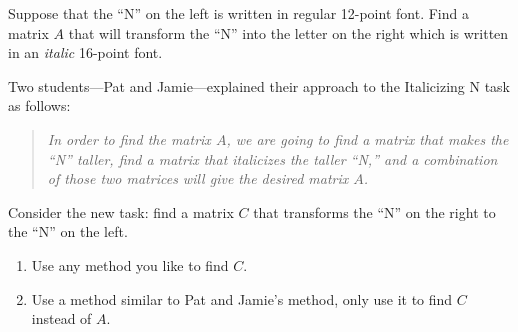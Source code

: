 \documentclass{problemset}
\begin{document}
\begin{minipage}{.5\textwidth}
\hfill
{}\hfill
\end{minipage}
\begin{minipage}{.5\textwidth}

Suppose that the ``N'' on the left is written in regular 12-point font.  Find a matrix $A$ that will transform
	the ``N'' into the letter on the right which is written in an \emph{italic} 16-point font.
\end{minipage}

Two students---Pat and Jamie---explained their approach to the Italicizing N task as follows:
\begin{quote}\itshape
	In order to find the matrix $A$, we are going to find a matrix that makes the ``N'' taller,
	find a matrix that italicizes the taller ``N,'' and a combination of those two matrices
	will give the desired matrix $A$.
\end{quote}

Consider the new task: find a matrix $C$ that transforms the ``N'' on the right to
the ``N'' on the left.
\begin{enumerate}
	\item Use any method you like to find $C$.
	\item Use a method similar to Pat and Jamie's method, only use it to find $C$ instead
		of $A$.
\end{enumerate}
\end{document}
